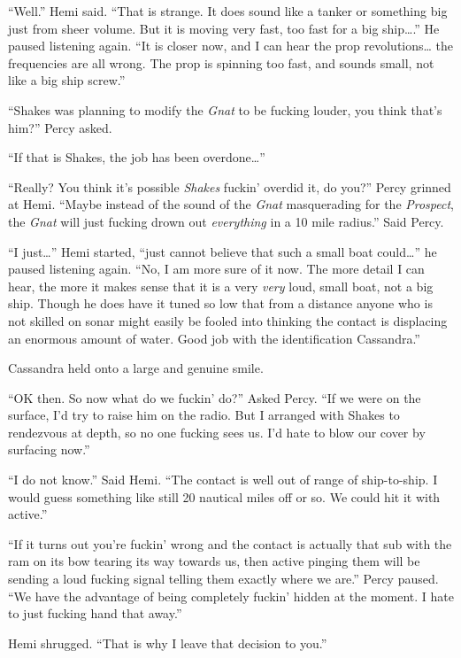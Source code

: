 \documentclass[
]{scrbook}
\begin{document}
``Well.'' Hemi said. ``That is strange. It does sound like a tanker or
something big just from sheer volume. But it is moving very fast, too
fast for a big ship\ldots.'' He paused listening again. ``It is closer
now, and I can hear the prop revolutions\ldots{} the frequencies are all
wrong. The prop is spinning too fast, and sounds small, not like a big
ship screw.''

``Shakes was planning to modify the \emph{Gnat} to be fucking louder,
you think that's him?'' Percy asked.

``If that is Shakes, the job has been overdone\ldots{}''

``Really? You think it's possible \emph{Shakes} fuckin' overdid it, do
you?'' Percy grinned at Hemi. ``Maybe instead of the sound of the
\emph{Gnat} masquerading for the \emph{Prospect}, the \emph{Gnat} will
just fucking drown out \emph{everything} in a 10 mile radius.'' Said
Percy.

``I just\ldots{}'' Hemi started, ``just cannot believe that such a small
boat could\ldots{}'' he paused listening again. ``No, I am more sure of
it now. The more detail I can hear, the more it makes sense that it is a
very \emph{very} loud, small boat, not a big ship. Though he does have
it tuned so low that from a distance anyone who is not skilled on sonar
might easily be fooled into thinking the contact is displacing an
enormous amount of water. Good job with the identification Cassandra.''

Cassandra held onto a large and genuine smile.

``OK then. So now what do we fuckin' do?'' Asked Percy. ``If we were on
the surface, I'd try to raise him on the radio. But I arranged with
Shakes to rendezvous at depth, so no one fucking sees us. I'd hate to
blow our cover by surfacing now.''

``I do not know.'' Said Hemi. ``The contact is well out of range of
ship-to-ship. I would guess something like still 20 nautical miles off
or so. We could hit it with active.''

``If it turns out you're fuckin' wrong and the contact is actually that
sub with the ram on its bow tearing its way towards us, then active
pinging them will be sending a loud fucking signal telling them exactly
where we are.'' Percy paused. ``We have the advantage of being
completely fuckin' hidden at the moment. I hate to just fucking hand
that away.''

Hemi shrugged. ``That is why I leave that decision to you.''
\end{document}
